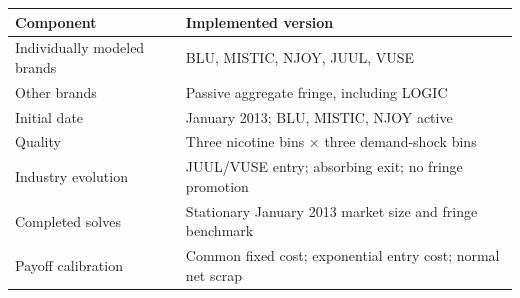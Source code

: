\documentclass[11pt,]{article}
\begin{document}
\begin{longtable}[]{@{}ll@{}}
\toprule
\begin{minipage}[b]{0.32\columnwidth}\raggedright\strut
Component\strut
\end{minipage} & \begin{minipage}[b]{0.62\columnwidth}\raggedright\strut
Implemented version\strut
\end{minipage}\tabularnewline
\midrule
\endhead
\begin{minipage}[t]{0.32\columnwidth}\raggedright\strut
Individually modeled brands\strut
\end{minipage} & \begin{minipage}[t]{0.62\columnwidth}\raggedright\strut
BLU, MISTIC, NJOY, JUUL, VUSE\strut
\end{minipage}\tabularnewline
\begin{minipage}[t]{0.32\columnwidth}\raggedright\strut
Other brands\strut
\end{minipage} & \begin{minipage}[t]{0.62\columnwidth}\raggedright\strut
Passive aggregate fringe, including LOGIC\strut
\end{minipage}\tabularnewline
\begin{minipage}[t]{0.32\columnwidth}\raggedright\strut
Initial date\strut
\end{minipage} & \begin{minipage}[t]{0.62\columnwidth}\raggedright\strut
January 2013; BLU, MISTIC, NJOY active\strut
\end{minipage}\tabularnewline
\begin{minipage}[t]{0.32\columnwidth}\raggedright\strut
Quality\strut
\end{minipage} & \begin{minipage}[t]{0.62\columnwidth}\raggedright\strut
Three nicotine bins × three demand-shock bins\strut
\end{minipage}\tabularnewline
\begin{minipage}[t]{0.32\columnwidth}\raggedright\strut
Industry evolution\strut
\end{minipage} & \begin{minipage}[t]{0.62\columnwidth}\raggedright\strut
JUUL/VUSE entry; absorbing exit; no fringe promotion\strut
\end{minipage}\tabularnewline
\begin{minipage}[t]{0.32\columnwidth}\raggedright\strut
Completed solves\strut
\end{minipage} & \begin{minipage}[t]{0.62\columnwidth}\raggedright\strut
Stationary January 2013 market size and fringe benchmark\strut
\end{minipage}\tabularnewline
\begin{minipage}[t]{0.32\columnwidth}\raggedright\strut
Payoff calibration\strut
\end{minipage} & \begin{minipage}[t]{0.62\columnwidth}\raggedright\strut
Common fixed cost; exponential entry cost; normal net scrap\strut
\end{minipage}\tabularnewline
\bottomrule
\end{longtable}
\end{document}
